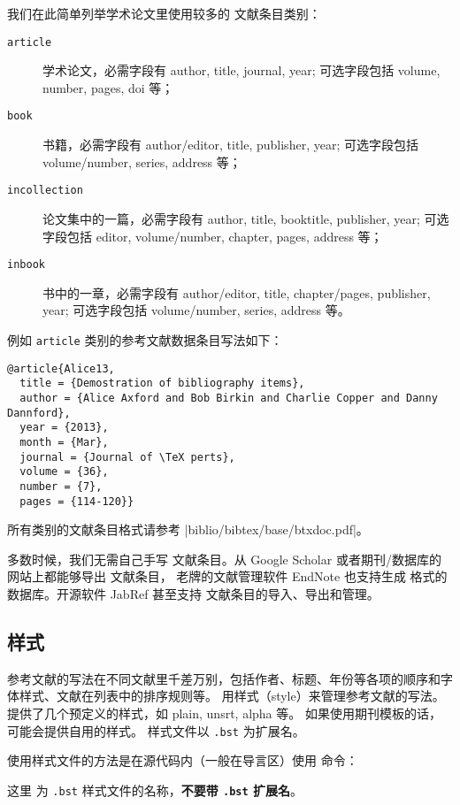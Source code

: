 我们在此简单列举学术论文里使用较多的  文献条目类别：
\begin{description}
  \item[\texttt{article}] 学术论文，必需字段有 author, title, journal, year; 可选字段包括 volume, number, pages, doi 等；
  \item[\texttt{book}] 书籍，必需字段有 author/editor, title, publisher, year; 可选字段包括 volume/number, series, address 等；
  \item[\texttt{incollection}] 论文集中的一篇，必需字段有 author, title, booktitle, publisher, year; 可选字段包括 editor, volume/number, chapter, pages, address 等；
  \item[\texttt{inbook}] 书中的一章，必需字段有 author/editor, title, chapter/pages, publisher, year; 可选字段包括 volume/number, series, address 等。
\end{description}

例如 \texttt{article} 类别的参考文献数据条目写法如下：
\begin{verbatim}
@article{Alice13,
  title = {Demostration of bibliography items},
  author = {Alice Axford and Bob Birkin and Charlie Copper and Danny Dannford},
  year = {2013},
  month = {Mar},
  journal = {Journal of \TeX perts},
  volume = {36},
  number = {7},
  pages = {114-120}}
\end{verbatim}
所有类别的文献条目格式请参考 \CTAN|biblio/bibtex/base/btxdoc.pdf|。

多数时候，我们无需自己手写  文献条目。从 Google Scholar 或者期刊/数据库的网站上都能够导出  文献条目，
老牌的文献管理软件 EndNote 也支持生成  格式的数据库。开源软件 JabRef 甚至支持  文献条目的导入、导出和管理。

\subsection{ 样式}\label{subsec:bibtex-style}

参考文献的写法在不同文献里千差万别，包括作者、标题、年份等各项的顺序和字体样式、文献在列表中的排序规则等。
 用样式（style）来管理参考文献的写法。 提供了几个预定义的样式，如 plain, unsrt, alpha 等。
如果使用期刊模板的话，可能会提供自用的样式。
样式文件以 \texttt{.bst} 为扩展名。

使用样式文件的方法是在源代码内（一般在导言区）使用  命令：
\begin{command}
\end{command}
这里  为 \texttt{.bst} 样式文件的名称，\textbf{不要带 \texttt{.bst} 扩展名}。

